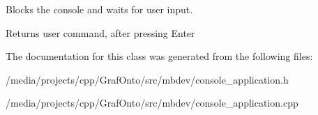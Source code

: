 \-Blocks the console and waits for user input. 

\begin{DoxyReturn}{\-Returns}
user command, after pressing \-Enter 
\end{DoxyReturn}


\-The documentation for this class was generated from the following files\-:\begin{DoxyCompactItemize}
\item 
/media/projects/cpp/\-Graf\-Onto/src/mbdev/console\-\_\-application.\-h\item 
/media/projects/cpp/\-Graf\-Onto/src/mbdev/console\-\_\-application.\-cpp\end{DoxyCompactItemize}

